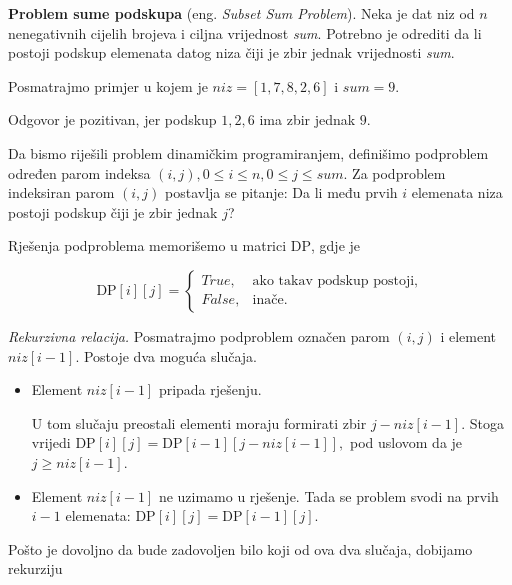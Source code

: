 
\begin{example} \textbf{Problem sume podskupa} (eng. \emph{Subset Sum Problem}). Neka je dat niz od $n$ nenegativnih cijelih brojeva i ciljna vrijednost \textit{sum}. Potrebno je odrediti da li postoji podskup elemenata datog niza čiji je zbir jednak vrijednosti \textit{sum}.
\end{example}

\begin{solution}
	
	Posmatrajmo primjer u kojem je $
	niz=[1,7,8,2,6]
	$ i  $sum=9.$
	
		Odgovor je pozitivan, jer podskup ${1,2,6}$ ima zbir jednak $9$.
	
	\medskip
	
	Da bismo riješili problem dinamičkim programiranjem, definišimo podproblem određen parom indeksa $
	(i,j),
	0 \leq i \leq n,
	0 \leq j \leq sum.$ Za podproblem indeksiran parom  $(i,j)$ postavlja se  pitanje: Da li među prvih $i$ elemenata niza postoji podskup čiji je zbir jednak $j$? 
	
	Rješenja podproblema memorišemo u matrici $\textrm{DP}$, gdje je
	
	$$
	\textrm{DP}[i][j]=
	\begin{cases}
		True, & \text{ako takav podskup postoji},\\
		False, & \text{inače}.
	\end{cases}
	$$
	
	\medskip
	
	\textit{Rekurzivna relacija.} 	Posmatrajmo podproblem označen parom $(i,j)$ i element $niz[i-1]$. Postoje dva moguća slučaja.
	
	\begin{itemize}
		\item {Element $niz[i-1]$ pripada rješenju.}
		
		U tom slučaju preostali elementi moraju formirati zbir $j-niz[i-1].$	Stoga vrijedi $\textrm{DP}[i][j] = \textrm{DP}[i-1][j-niz[i-1]],$
		pod uslovom da je $
		j \geq niz[i-1].$
		
		\item {Element $niz[i-1]$ ne uzimamo u rješenje.} Tada se problem svodi na prvih $i-1$ elemenata:
		$ \textrm{DP}[i][j] = \textrm{DP}[i-1][j].$
		
	\end{itemize}
	
	Pošto je dovoljno da bude zadovoljen bilo koji od ova dva slučaja, dobijamo rekurziju
	

\end{solution}
